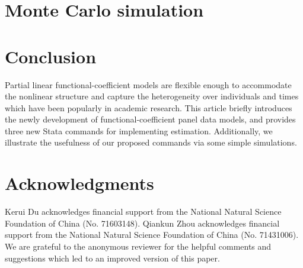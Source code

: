 \section{Monte Carlo simulation}



%	

\section{Conclusion}
Partial linear functional-coefficient models are flexible enough to accommodate the nonlinear structure and capture the heterogeneity over individuals and times which have been popularly in academic research. This article briefly introduces the newly development of functional-coefficient panel data models, and provides three new Stata commands for implementing estimation. Additionally, we illustrate the usefulness of our proposed commands via some simple simulations.


\section{Acknowledgments}
  Kerui Du acknowledges financial support from the National Natural Science Foundation of China (No. 71603148). Qiankun Zhou acknowledges financial support from the National Natural Science Foundation of China (No. 71431006). We are grateful to the anonymous reviewer for the helpful comments and suggestions which led to an improved version of this paper. 

\endinput 